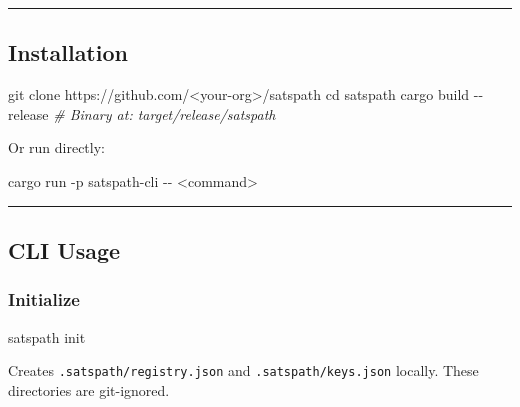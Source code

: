 \documentclass[
]{article}
\newenvironment{Shaded}{}{}
\newcommand{\AttributeTok}[1]{\textcolor[rgb]{0.49,0.56,0.16}{#1}}
\newcommand{\BuiltInTok}[1]{\textcolor[rgb]{0.00,0.50,0.00}{#1}}
\newcommand{\CommentTok}[1]{\textcolor[rgb]{0.38,0.63,0.69}{\textit{#1}}}
\newcommand{\ExtensionTok}[1]{#1}
\newcommand{\FunctionTok}[1]{\textcolor[rgb]{0.02,0.16,0.49}{#1}}
\newcommand{\NormalTok}[1]{#1}
\newcommand{\OperatorTok}[1]{\textcolor[rgb]{0.40,0.40,0.40}{#1}}
\begin{document}
\begin{center}\rule{0.5\linewidth}{0.5pt}\end{center}

\hypertarget{installation}{%
\subsection{Installation}\label{installation}}

\begin{Shaded}
\begin{Highlighting}[]
\FunctionTok{git}\NormalTok{ clone https://github.com/}\OperatorTok{\textless{}}\NormalTok{your{-}org}\OperatorTok{\textgreater{}}\NormalTok{/satspath}
\BuiltInTok{cd}\NormalTok{ satspath}
\ExtensionTok{cargo}\NormalTok{ build }\AttributeTok{{-}{-}release}
\CommentTok{\# Binary at: target/release/satspath}
\end{Highlighting}
\end{Shaded}

Or run directly:

\begin{Shaded}
\begin{Highlighting}[]
\ExtensionTok{cargo}\NormalTok{ run }\AttributeTok{{-}p}\NormalTok{ satspath{-}cli }\AttributeTok{{-}{-}} \OperatorTok{\textless{}}\NormalTok{command}\OperatorTok{\textgreater{}}
\end{Highlighting}
\end{Shaded}

\begin{center}\rule{0.5\linewidth}{0.5pt}\end{center}

\hypertarget{cli-usage}{%
\subsection{CLI Usage}\label{cli-usage}}

\hypertarget{initialize}{%
\subsubsection{Initialize}\label{initialize}}

\begin{Shaded}
\begin{Highlighting}[]
\ExtensionTok{satspath}\NormalTok{ init}
\end{Highlighting}
\end{Shaded}

Creates \texttt{.satspath/registry.json} and
\texttt{.satspath/keys.json} locally. These directories are git-ignored.
\end{document}
